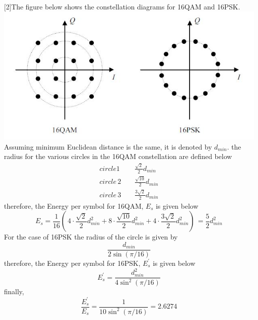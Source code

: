 \documentclass[24 pts]{article}
\begin{document}
\paragraph{}
[2]The figure below shows the constellation diagrams for 16QAM and 16PSK.
\includegraphics[scale =0.5]{Capture}\\
 Assuming minimum Euclidean distance is the same, it is denoted by $d_{min}$.
the radius for the various circles in the 16QAM constellation are defined below
\begin{equation*}
\begin{split}
circle 1 \, \,\,\,\,\,\,&\frac{\sqrt{2}}{2}d_{min}\\
circle \,2  \,\,\,\,\,\,\, &\frac{\sqrt{10}}{2}d_{min}\\
 circle \,3 \,\,\,\,\,\,\, &\frac{3\sqrt{2}}{2}d_{min}
\end{split}
\end{equation*}
therefore, the Energy per symbol for 16QAM, $E_s$ is given below
$$E_s=\frac{1}{16}\left(\,4\cdot \frac{\sqrt{2}}{2}d_{min}^2+8\cdot \frac{\sqrt{10}}{2}d_{min}^2+4\cdot \frac{3\sqrt{2}}{2}d_{min}^2\right)\,=\frac{5}{2}d_{min}^2$$
For the case of 16PSK the radius of the circle is given by
$$\frac{d_{min}}{2\sin( \pi/16)}$$
therefore, the Energy per symbol for 16PSK, $E_s^{'}$ is given below
$$E_s^{'}=\frac{d_{min}^2}{4\sin^2( \pi/16)}$$
finally, $$\frac{E_s^{'}}{E_s}=\frac{1}{10\sin^2( \pi/16)}=2.6274$$
\end{document}
